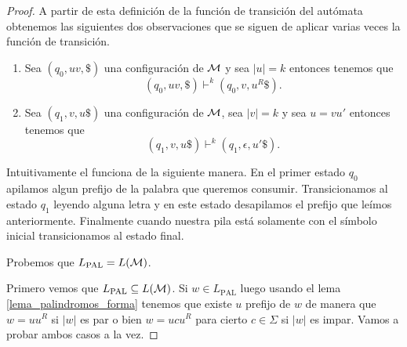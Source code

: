 \documentclass[tesis.tex]{subfiles}
\begin{document}
\begin{proof}
	A partir de esta definición de la función de transición del autómata obtenemos las siguientes dos observaciones que se siguen de aplicar varias veces la función de transición.
	
	\begin{enumerate}
		\item 
		Sea $(q_{0},uv, \$)$ una configuración de $\cal M$ y sea $|u| = k$ entonces tenemos que 
		\[
			(q_{0},uv, \$) \vdash^k (q_{0}, v, u^R \$).
		\]
		
		\item Sea $(q_{1},v, u\$)$ una configuración de $\cal M$, sea $|v| = k$ y 
		sea $u = vu'$  entonces tenemos que 
		\[
		(q_{1},v, u\$) \vdash^k (q_{1}, \epsilon, u' \$).
		\]
	\end{enumerate}
	
	
	Intuitivamente el \APND funciona de la siguiente manera. 
	En el primer estado $q_{0}$ apilamos algun prefijo de la palabra que queremos consumir.
	Transicionamos al estado $q_{1}$ leyendo alguna letra y en este estado desapilamos el prefijo que leímos anteriormente.
	Finalmente cuando nuestra pila está solamente con el símbolo inicial transicionamos	al estado final.
	
	Probemos que $L_{\text{PAL}} = L(\cal M)$.
	
	Primero vemos que $L_{\text{PAL}} \subseteq L(\cal M)$.
	Si $w \in L_{\text{PAL}}$ luego usando el lema \ref{lema_palindromos_forma}
	tenemos que existe $u$ prefijo de $w$ de manera que
	$w = uu^R$ si $|w|$ es par
	o bien $w = ucu^R$ para cierto $c \in \Sigma$ si $|w|$ es impar.
	Vamos a probar ambos casos a la vez.
	

\end{proof}
\end{document}
